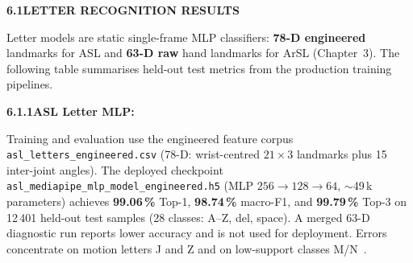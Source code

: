 \noindent\textbf{6.1\quad LETTER RECOGNITION RESULTS}\par
{}
\vspace{0.2cm}

\noindent Letter models are static single-frame MLP classifiers: \textbf{78-D engineered} landmarks for ASL and \textbf{63-D raw} hand landmarks for ArSL (Chapter~3). The following table summarises held-out test metrics from the production training pipelines.\par\vspace{0.2cm}

\begin{table}[H]
\centering
\caption{Letter-model held-out test metrics (canonical training pipelines).}
\label{tab:ch5-letters}
\footnotesize
\renewcommand{\arraystretch}{1.6} %
\end{table}
\vspace{0.4cm}

\noindent\textbf{6.1.1\quad ASL Letter MLP:}\par
{}
\vspace{0.3cm}

\noindent Training and evaluation use the engineered feature corpus \texttt{asl\_\allowbreak letters\_\allowbreak engineered.csv} (78-D: wrist-centred $21{\times}3$ landmarks plus 15 inter-joint angles). The deployed checkpoint \texttt{asl\_\allowbreak mediapipe\_\allowbreak mlp\_\allowbreak model\_\allowbreak engineered.h5} (MLP $256{\rightarrow}128{\rightarrow}64$, $\sim$49\,k parameters) achieves \textbf{99.06\,\%} Top-1, \textbf{98.74\,\%} macro-F1, and \textbf{99.79\,\%} Top-3 on 12\,401 held-out test samples (28 classes: A--Z, del, space). A merged 63-D diagnostic run reports lower accuracy and is not used for deployment. Errors concentrate on motion letters J and Z and on low-support classes M/N~\cite{akash2019aslalphabet}.\par\vspace{0.3cm}

